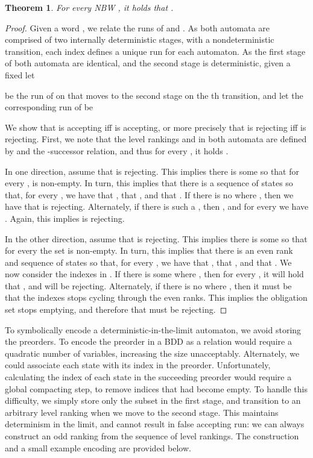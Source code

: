 \documentclass{LMCS}
\newtheorem{theorem}{Theorem}[section]
\begin{document}
\begin{theorem}\label{Schewe_Complement}
For every NBW , it holds that .
\end{theorem}
\begin{proof}
Given a word , we relate the runs of  and . As both
automata are comprised of two internally deterministic stages, with a
nondeterministic transition, each index  defines a unique run for each
automaton.  As the first stage of both automata are identical, and the second
stage is deterministic, given a fixed  let 

be the run of  on  that moves to the second stage on the th transition, and let
the corresponding run of  be

We show that  is accepting iff  is accepting, or more precisely that
 is rejecting iff  is rejecting.  First, we note that
the level rankings  and  in both automata are
defined by  and the -successor relation, and thus for every , it holds . 

In one direction, assume that  is rejecting.  This implies there
is some  so that for every ,  is non-empty. In turn,
this implies that there is a sequence  of states so that,
for every , we have that , that
, and that . If there is
no  where , then we have that  is rejecting.
Alternately, if there is such a , then , and for
every  we have . Again, this implies  is
rejecting.

In the other direction, assume that  is rejecting. This implies there is some  so that for
every  the set  is non-empty. In turn, this implies that there is an
even rank  and sequence  of states so that, for every
, we have that , that , and
that . We now consider the indexes 
in . If there is some  where , then for every , it will hold that , and  will be rejecting.
Alternately, if there is no  where , then it must be that the
indexes  stops cycling through the even ranks. This implies the
obligation set stops emptying, and therefore that  must be rejecting.
\end{proof}

To symbolically encode a deterministic-in-the-limit automaton, we avoid storing the preorders.  To
encode the preorder in a BDD as a relation would require a quadratic number of variables, increasing
the size unacceptably. Alternately, we could associate each state with its index in the preorder.
Unfortunately, calculating the index of each state in the succeeding preorder would require a global
compacting step, to remove indices that had become empty. To handle this difficulty, we simply store
only the subset in the first stage, and transition to an arbitrary level ranking when we move to the
second stage. This maintains determinism in the limit, and cannot result in false accepting run: we
can always construct an odd ranking from the sequence of level rankings. The construction and a
small example encoding are provided below.
\end{document}
